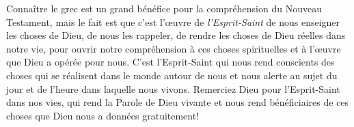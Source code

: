 Connaître le grec est un grand bénéfice pour la compréhension
 du Nouveau Testament, mais le fait est que c'est l'œuvre
 de \emph{l'Esprit-Saint} de nous enseigner les choses de Dieu,
 de nous les rappeler, de rendre les choses de Dieu réelles
 dans notre vie, pour ouvrir notre compréhension
 à ces choses spirituelles et à l'œuvre que Dieu a opérée pour nous.
 C'est l'Esprit-Saint qui nous rend conscients des choses
 qui se réalisent dans le monde autour de nous et nous alerte
 au sujet du jour et de l'heure dans laquelle nous vivons.
 Remerciez Dieu pour l'Esprit-Saint dans nos vies,
 qui rend la Parole de Dieu vivante et nous rend bénéficiaires
 de ces choses que Dieu nous a données gratuitement!
\closechapter

